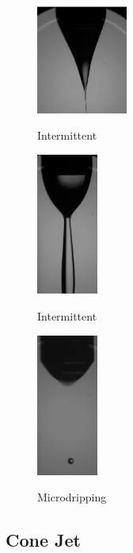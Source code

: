 \begin{multicols}{3}

  \begin{figure}[H]
      \center
      \includegraphics[width=3cm]{Figuras/19:03/intermittent_example.png}
      \label{fig:intermittent_example}
      \caption{Intermittent}
  \end{figure}


  \begin{figure}[H]
      \center
      \includegraphics[width=2cm]{Figuras/19:03/intermittent2_example.png}
      \label{fig:intermittent2_example}
      \caption{Intermittent}
  \end{figure}


  \begin{figure}[H]
      \center
      \includegraphics[width=2cm]{Figuras/19:03/microdripping_example.png}
      \label{fig:microdripping_example}
      \caption{Microdripping}
  \end{figure}

\end{multicols}

\subsection{Cone Jet}
\label{subsec:Cone Jet}

